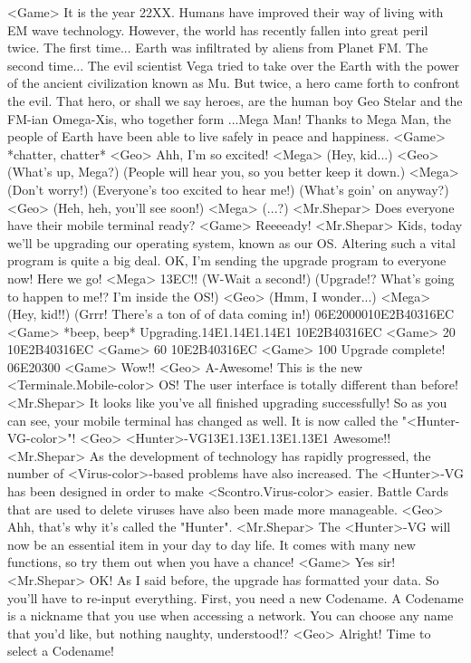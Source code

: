 <Game> It is the year 22XX. 
Humans have improved their way of living with EM wave technology. 
However, the world has recently fallen into great peril twice. 
The first time... Earth was infiltrated by aliens from Planet FM. 
The second time... The evil scientist Vega tried to take over the 
Earth with the power of  the ancient civilization known as Mu. 
But twice, a hero came forth to confront the evil. 
That hero, or shall we say heroes, are the human boy Geo Stelar and the FM-ian 
Omega-Xis, who together form ...Mega Man! 
Thanks to Mega Man, the people of Earth have been 
able to live safely in peace and happiness. 
<Game> *chatter, chatter* 
<Geo> Ahh, I'm so excited! 
<Mega> (Hey, kid...) 
<Geo> (What's up, Mega?) 
(People will hear you, so  you better keep it down.) 
<Mega> (Don't worry!) 
(Everyone's too  excited to hear me!) 
(What's goin' on anyway?) 
<Geo> (Heh, heh, you'll see soon!) 
<Mega> (...?) 
<Mr.Shepar> Does everyone have their mobile terminal ready? 
<Game> Reeeeady! 
<Mr.Shepar> Kids, today we'll be upgrading our operating system, known as our OS. 
Altering such a vital program is quite a big deal. 
OK, I'm sending the upgrade program to everyone now! Here we go! 
<Mega> {13}{EC}!! 
(W-Wait a second!) 
(Upgrade!? What's going to  happen to me!? I'm inside  the OS!) 
<Geo> (Hmm, I wonder...) 
<Mega> (Hey, kid!!) 
(Grrr! There's a ton of  of data coming in!) 
{06}{E2}{00}{00}{10}{E2}{B4}{03}{16}{EC} 
<Game> *beep, beep* Upgrading.{14}{E1}.{14}{E1}.{14}{E1} 
{10}{E2}{B4}{03}{16}{EC} 
<Game> 20%
{10}{E2}{B4}{03}{16}{EC} 
<Game> 60%
{10}{E2}{B4}{03}{16}{EC} 
<Game> 100%
Upgrade complete! 
{06}{E2}{03}{00}
<Game> Wow!! 
<Geo> A-Awesome! 
This is the new <Terminale.Mobile-color> OS! 
The user interface is totally different than before! 
<Mr.Shepar> It looks like you've all finished upgrading successfully! 
So as you can see, your mobile terminal has changed as well. 
It is now called the  "<Hunter-VG-color>"! 
<Geo> <Hunter>-VG{13}{E1}.{13}{E1}.{13}{E1}.{13}{E1} 
Awesome!! 
<Mr.Shepar> As the development of technology has rapidly progressed, the number of 
<Virus-color>-based problems have also increased. 
The <Hunter>-VG has been designed in order to make <Scontro.Virus-color> easier. 
Battle Cards that are used to delete viruses 
have also been made more manageable. 
<Geo> Ahh, that's why it's called the "Hunter". 
<Mr.Shepar> The <Hunter>-VG will now be an essential item in your day to day life. 
It comes with many new functions, so try them out when you have a chance! 
<Game> Yes sir! 
<Mr.Shepar> OK! 
As I said before, the upgrade has formatted your data. 
So you'll have to re-input  everything. 
First, you need a new Codename. 
A Codename is a nickname that you use when accessing a network. 
You can choose any name that you'd like, but nothing naughty, understood!? 
<Geo> Alright! Time to select a Codename! 

